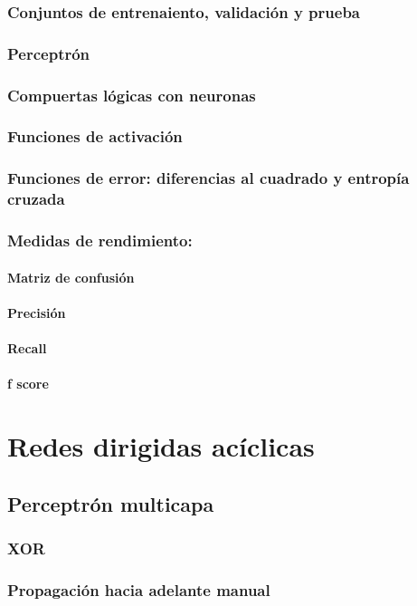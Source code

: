 \documentclass[12pt,openany]{book}
\begin{document}
\section{Conjuntos de entrenaiento, validación y prueba}
\section{Perceptrón}
\section{Compuertas lógicas con neuronas}
\section{Funciones de activación}
\section{Funciones de error: diferencias al cuadrado y entropía cruzada}
\section{Medidas de rendimiento:}
\subsection{Matriz de confusión}
\subsection{Precisión}
\subsection{Recall}
\subsection{f score}

\part{Redes dirigidas acíclicas}
\chapter{Perceptrón multicapa}
\section{XOR}
\section{Propagación hacia adelante manual}
\end{document}
